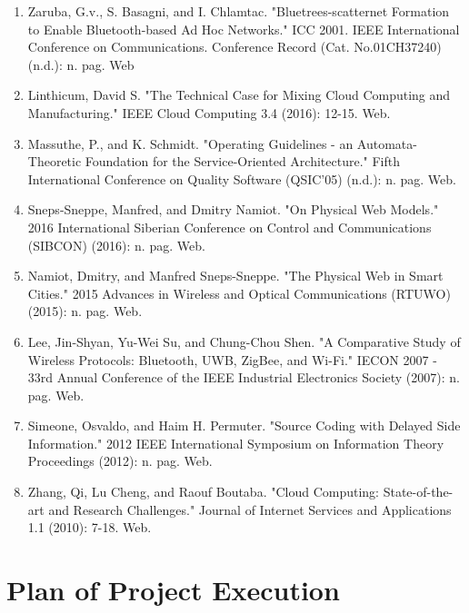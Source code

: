 \documentclass[oneside,a4paper,12pt]{report}
\begin{document}
\begin{enumerate}

\item Zaruba, G.v., S. Basagni, and I. Chlamtac. "Bluetrees-scatternet Formation to Enable Bluetooth-based Ad Hoc Networks." ICC 2001. IEEE International Conference on Communications. Conference Record (Cat. No.01CH37240) (n.d.): n. pag. Web\\
\item Linthicum, David S. "The Technical Case for Mixing Cloud Computing and Manufacturing." IEEE Cloud Computing 3.4 (2016): 12-15. Web.\\
\item Massuthe, P., and K. Schmidt. "Operating Guidelines - an Automata-Theoretic Foundation for the Service-Oriented Architecture." Fifth International Conference on Quality Software (QSIC'05) (n.d.): n. pag. Web.\\
\item Sneps-Sneppe, Manfred, and Dmitry Namiot. "On Physical Web Models." 2016 International Siberian Conference on Control and Communications (SIBCON) (2016): n. pag. Web.\\
\item Namiot, Dmitry, and Manfred Sneps-Sneppe. "The Physical Web in Smart Cities." 2015 Advances in Wireless and Optical Communications (RTUWO) (2015): n. pag. Web.\\
\item Lee, Jin-Shyan, Yu-Wei Su, and Chung-Chou Shen. "A Comparative Study of Wireless Protocols: Bluetooth, UWB, ZigBee, and Wi-Fi." IECON 2007 - 33rd Annual Conference of the IEEE Industrial Electronics Society (2007): n. pag. Web.\\
\item Simeone, Osvaldo, and Haim H. Permuter. "Source Coding with Delayed Side Information." 2012 IEEE International Symposium on Information Theory Proceedings (2012): n. pag. Web.\\
\item Zhang, Qi, Lu Cheng, and Raouf Boutaba. "Cloud Computing: State-of-the-art and Research Challenges." Journal of Internet Services and Applications 1.1 (2010): 7-18. Web.\\


\end{enumerate}   

\section{Plan of Project Execution}
\end{document}
